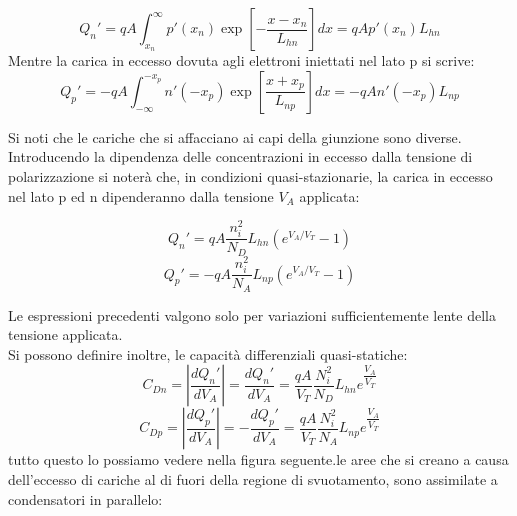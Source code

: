 \begin{equation}
    Q_n'=qA\int_{x_n}^{\infty} p'(x_n) \exp\left[ -\dfrac{x-x_n}{L_{hn}} \right] dx=qAp'(x_n)L_{hn}
\end{equation}
Mentre la carica in eccesso dovuta agli elettroni iniettati nel lato p si scrive:
\begin{equation}
    Q_p'=-qA\int_{-\infty}^{-x_p} n'(-x_p) \exp\left[ \dfrac{x+x_p}{L_{np}} \right] dx=-qAn'(-x_p)L_{np}
\end{equation}

Si noti che le cariche che si affacciano ai capi della giunzione sono diverse.\\
Introducendo la dipendenza delle concentrazioni in eccesso dalla tensione di polarizzazione si noterà che, in condizioni quasi-stazionarie, la carica in eccesso nel lato p ed n dipenderanno dalla tensione $V_A$ applicata:

\begin{equation}
    Q_n'=qA\dfrac{n_i^2}{N_D}L_{hn}\left( e^{{V_A}/{V_T}}-1\right)
\end{equation}
\begin{equation}
    Q_p'=-qA\dfrac{n_i^2}{N_A}L_{np}\left( e^{{V_A}/{V_T}}-1\right)
\end{equation}

Le espressioni precedenti valgono solo per variazioni sufficientemente lente della tensione applicata.\\
Si possono definire inoltre, le capacità differenziali quasi-statiche:
\begin{equation}
    C_{Dn}=\left| \dfrac{dQ_n'}{dV_A}\right|=\dfrac{dQ_n'}{dV_A}=\dfrac{qA}{V_T}\dfrac{N_i^2}{N_D}L_{hn}e^{\dfrac{V_A}{V_T}}
\end{equation}
\begin{equation}
    C_{Dp}=\left| \dfrac{dQ_p'}{dV_A}\right|=-\dfrac{dQ_p'}{dV_A}=\dfrac{qA}{V_T}\dfrac{N_i^2}{N_A}L_{np}e^{\dfrac{V_A}{V_T}}
\end{equation}
tutto questo lo possiamo vedere nella figura seguente.le aree che si creano a causa dell'eccesso di cariche al di fuori della regione di svuotamento, sono assimilate a condensatori in parallelo:


